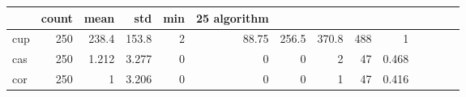 \begin{tabular}{lrrrrrrrrr}
\toprule
 & count & mean & std & min & 25%
algorithm &  &  &  &  &  &  &  &  &  \\
\midrule
cup & 250 & 238.4 & 153.8 & 2 & 88.75 & 256.5 & 370.8 & 488 & 1 \\
cas & 250 & 1.212 & 3.277 & 0 & 0 & 0 & 2 & 47 & 0.468 \\
cor & 250 & 1 & 3.206 & 0 & 0 & 0 & 1 & 47 & 0.416 \\
\bottomrule
\end{tabular}
